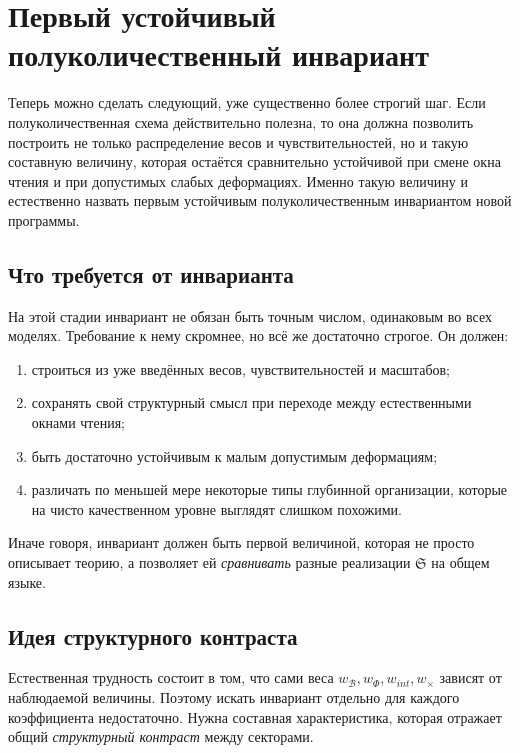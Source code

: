 \documentclass[12pt,a4paper]{article}
\begin{document}
\section{Первый устойчивый полуколичественный инвариант}

Теперь можно сделать следующий, уже существенно более строгий шаг. Если полуколичественная схема действительно полезна, то она должна позволить построить не только распределение весов и чувствительностей, но и такую составную величину, которая остаётся сравнительно устойчивой при смене окна чтения и при допустимых слабых деформациях. Именно такую величину и естественно назвать первым устойчивым полуколичественным инвариантом новой программы.

\subsection{Что требуется от инварианта}

На этой стадии инвариант не обязан быть точным числом, одинаковым во всех моделях. Требование к нему скромнее, но всё же достаточно строгое. Он должен:
\begin{enumerate}
    \item строиться из уже введённых весов, чувствительностей и масштабов;
    \item сохранять свой структурный смысл при переходе между естественными окнами чтения;
    \item быть достаточно устойчивым к малым допустимым деформациям;
    \item различать по меньшей мере некоторые типы глубинной организации, которые на чисто качественном уровне выглядят слишком похожими.
\end{enumerate}

Иначе говоря, инвариант должен быть первой величиной, которая не просто описывает теорию, а позволяет ей \textit{сравнивать} разные реализации \(\mathfrak{S}\) на общем языке.

\subsection{Идея структурного контраста}

Естественная трудность состоит в том, что сами веса \(w_{\mathcal{B}}, w_{\Phi}, w_{int}, w_{\times}\) зависят от наблюдаемой величины. Поэтому искать инвариант отдельно для каждого коэффициента недостаточно. Нужна составная характеристика, которая отражает общий \textit{структурный контраст} между секторами.
\end{document}
